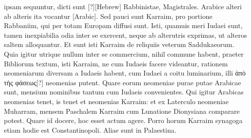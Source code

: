 ipsam sequuntur, dicti sunt \texthebrew{[?]}[Hebrew] Rabbinistae, Magistrales.
Arabice
alteri ab alteris ita vocantur \textarabic{[Arabic]}.
Sed pauci sunt
Karraim, pro portione Rabbaniim, qui per totam Europam diffusi
sunt.
Isti, quamuis meri Iudaei sunt, tamen inexpiabilia odia inter
se exercent, neque ab alterutris exprimas, ut alteros saltem alloquantur.
%
Et sunt isti Karraim de reliquiis veterum Saddukaeorum.
Quia
igitur utrique nullum inter se commercium, nihil commune habent,
praeter Bibliorum textum, isti Karraim, ne cum Iudaeis facere
videantur, rationem neomeniarum diversam a Iudaeis habent, cum
Iudaei a coitu luminarium, illi \textgreek{ἀπὸ τὴς φάσεως[?]} neomenias putent.
Quare eorum neomeniae purae putae Arabicae sunt, mensium nominibus
tantum cum Iudaeis convenientes.
Qui igitur Arabicas neomenias
tenet, is tenet et neomenias Karraim: et ex Laterculo neomeniae
Muharram, mensem Paschalem Karraim cum Lunatione Dionysiana
comparare potest.
Quare id docere, hoc esset actum agere.
Porro horum Karraim synagoga etiam hodie est Constantinopoli.
Aliae sunt in Palaestina.
%
